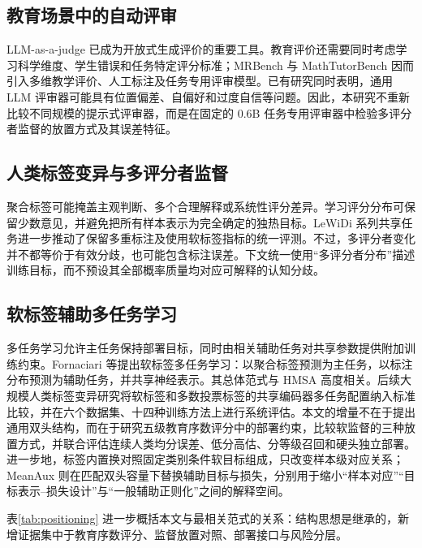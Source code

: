 \documentclass[UTF8,fontset=fandol,a4paper,11pt]{ctexart}
\begin{document}
\subsection{教育场景中的自动评审}

LLM-as-a-judge 已成为开放式生成评价的重要工具\cite{zheng2023mtbench}。教育评价还需要同时考虑学习科学维度、学生错误和任务特定评分标准；MRBench 与 MathTutorBench 因而引入多维教学评价、人工标注及任务专用评审模型\cite{maurya2025mrbench,macina2025mathtutorbench}。已有研究同时表明，通用 LLM 评审器可能具有位置偏差、自偏好和过度自信等问题\cite{gu2024survey,li2024llmjudge,wang2025overconfidence}。因此，本研究不重新比较不同规模的提示式评审器，而是在固定的 0.6B 任务专用评审器中检验多评分者监督的放置方式及其误差特征。

\subsection{人类标签变异与多评分者监督}

聚合标签可能掩盖主观判断、多个合理解释或系统性评分差异\cite{plank2022,davani2022}。学习评分分布可保留少数意见，并避免把所有样本表示为完全确定的独热目标\cite{peterson2019human,uma2021learning}。LeWiDi 系列共享任务进一步推动了保留多重标注及使用软标签指标的统一评测\cite{lewidi2021,lewidi2023}。不过，多评分者变化并不都等价于有效分歧，也可能包含标注误差。下文统一使用“多评分者分布”描述训练目标，而不预设其全部概率质量均对应可解释的认知分歧。

\subsection{软标签辅助多任务学习}

多任务学习允许主任务保持部署目标，同时由相关辅助任务对共享参数提供附加训练约束\cite{caruana1997multitask}。Fornaciari 等提出软标签多任务学习：以聚合标签预测为主任务，以标注分布预测为辅助任务，并共享神经表示\cite{fornaciari2021}。其总体范式与 HMSA 高度相关。后续大规模人类标签变异研究将软标签和多数投票标签的共享编码器多任务配置纳入标准比较，并在六个数据集、十四种训练方法上进行系统评估\cite{kurniawan2026}。本文的增量不在于提出通用双头结构，而在于研究五级教育序数评分中的部署约束，比较软监督的三种放置方式，并联合评估连续人类均分误差、低分高估、分等级召回和硬头独立部署。进一步地，标签内置换对照固定类别条件软目标组成，只改变样本级对应关系；MeanAux 则在匹配双头容量下替换辅助目标与损失，分别用于缩小“样本对应”“目标表示--损失设计”与“一般辅助正则化”之间的解释空间。

表\ref{tab:positioning} 进一步概括本文与最相关范式的关系：结构思想是继承的，新增证据集中于教育序数评分、监督放置对照、部署接口与风险分层。
\end{document}
